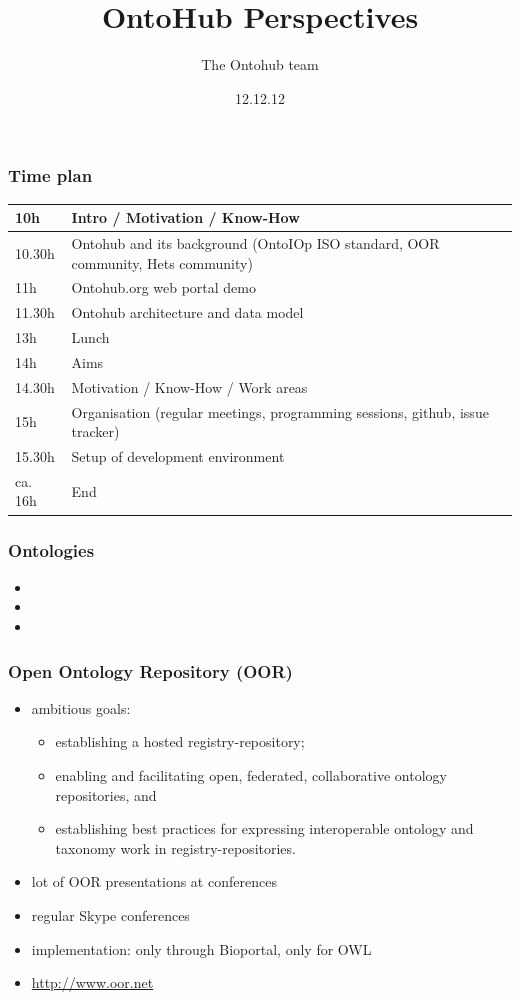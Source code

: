 \documentclass[german]{beamer}
\title{OntoHub Perspectives}
\author{The Ontohub team}
\date{12.12.12}
\begin{document}
\maketitle

\begin{frame}
\frametitle{Time plan}
\begin{tabular}{|l|p{9cm}|}\hline
10h & Intro / Motivation / Know-How\\\hline
10.30h & Ontohub and its background (OntoIOp ISO standard, OOR community, Hets community)\\\hline
11h & Ontohub.org web portal demo\\\hline
11.30h & Ontohub architecture and data model\\\hline
13h & Lunch\\\hline
14h & Aims\\\hline
14.30h & Motivation / Know-How / Work areas\\\hline
15h & Organisation (regular meetings, programming sessions, github, issue tracker)\\\hline
15.30h & Setup of development environment\\\hline
ca. 16h & End\\\hline
\end{tabular}
\end{frame}

\begin{frame}
\frametitle{Ontologies}
\begin{itemize}
\item 
\item 
\item 
\end{itemize}
\end{frame}

\begin{frame}
\frametitle{Open Ontology Repository (OOR)}
\begin{itemize}
\item ambitious goals:
\begin{itemize}
\item establishing a hosted registry-repository;
\item enabling and facilitating open, federated, collaborative ontology repositories, and
\item establishing best practices for expressing interoperable ontology and taxonomy work in registry-repositories.
\end{itemize}
\item lot of OOR presentations at conferences
\item regular Skype conferences
\item implementation: only through Bioportal, only for OWL
\item \url{http://www.oor.net}
\end{itemize}
\end{frame}
\end{document}
